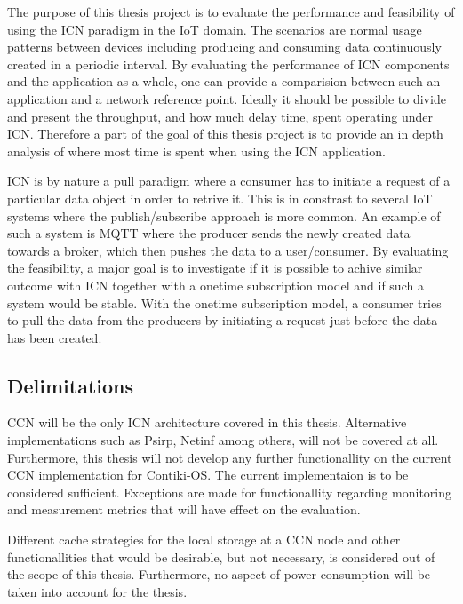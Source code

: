 The purpose of this thesis project is to evaluate the performance and feasibility of using the ICN paradigm in the IoT domain. The scenarios are normal usage patterns between devices including producing and consuming data continuously created in a periodic interval. By evaluating the performance of ICN components and the application as a whole, one can provide a comparision between such an application and a network reference  point. Ideally it should be possible  to divide and present the throughput, and how much delay time, spent operating under ICN. Therefore a part of the goal of this thesis project is to provide an in depth analysis of where most time is spent when using the ICN application. 

ICN is by nature a pull paradigm where a consumer has to initiate a request of a particular data object in order to retrive it. This is in constrast to several IoT systems where the publish/subscribe approach is more common. An example of such a system is MQTT \cite{mqtt} where the producer sends the newly created data towards a broker, which then pushes the data to a user/consumer. By evaluating the feasibility, a major goal is to investigate if it is possible to achive similar outcome with ICN together with a onetime subscription model and if such a system would be stable. With the onetime subscription model, a consumer tries to pull the data from the producers by initiating a request just before the data has been created.



\subsection{Delimitations}
CCN will be the only ICN architecture covered in this thesis. Alternative implementations such as Psirp, Netinf among others, will not be covered at all.
Furthermore, this thesis will not develop any further functionallity on the current CCN implementation for Contiki-OS. The current implementaion is to be considered sufficient. Exceptions are made for functionallity regarding monitoring and measurement metrics that will have effect on the evaluation. 

Different cache strategies for the local storage at a CCN node and other functionallities that would be desirable, but not necessary, is considered out of the scope of this thesis. Furthermore, no aspect of power consumption will be taken into account for the thesis.

